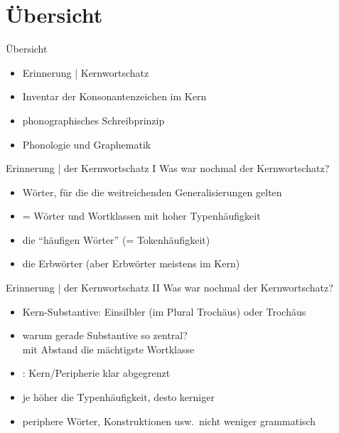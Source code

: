 \section{Übersicht}

\begin{frame}
  {Übersicht}
  \pause
  \begin{itemize}[<+->]
    \item Erinnerung | Kernwortschatz
      \Halbzeile
    \item Inventar der Konsonantenzeichen im Kern
      \Halbzeile
    \item phonographisches Schreibprinzip
      \Halbzeile
    \item Phonologie und Graphematik
  \end{itemize}
\end{frame}

\begin{frame}
  {Erinnerung | der Kernwortschatz I}
  \pause
  Was war nochmal der Kernwortschatz?\\
  \Halbzeile
  \pause
  \begin{itemize}[<+->]
    \item Wörter, für die \alert{die weitreichenden Generalisierungen gelten}
    \item = Wörter und Wortklassen mit \alert{hoher Typenhäufigkeit}
    \item {} die "`häufigen Wörter"' (= Tokenhäufigkeit)
    \item {} die Erbwörter (aber Erbwörter meistens im Kern)
  \end{itemize}
\end{frame}

\begin{frame}
  {Erinnerung | der Kernwortschatz II}
  \pause
  Was war nochmal der Kernwortschatz?\\
  \Halbzeile
  \pause
  \begin{itemize}[<+->]
    \item Kern-Substantive: Einsilbler (im Plural Trochäus) oder Trochäus
    \item warum gerade Substantive so zentral?\\
      \alert{mit Abstand die mächtigste Wortklasse}
      \Halbzeile
    \item {}: Kern\slash Peripherie klar abgegrenzt
    \item je höher die Typenhäufigkeit, desto kerniger
    \item periphere Wörter, Konstruktionen usw.\ \alert{nicht weniger grammatisch}
  \end{itemize}
\end{frame}


